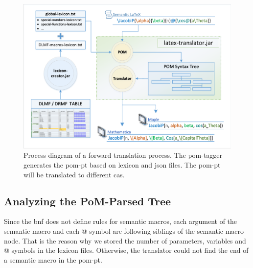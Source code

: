 \documentclass[a4paper,11pt]{article}
\theoremstyle{defTheoStyle}
\theoremstyle{defExampStyle}
\begin{document}
\begin{figure}[ht]
	\vspace{-10pt}
	\centering
	\includegraphics[clip, trim=0.2cm 0.2cm 0.2cm 0.2cm, scale=0.72]{ForwardTranslationProcess.pdf}
	\caption{Process diagram of a forward translation process. The \gls*{pom}-tagger generates the \gls*{pom-pt} based on lexicon and \gls*{json} files. The \gls*{pom-pt} will be translated to different \gls*{cas}.}
	\label{fig:forward-trans}
	\vspace{-10pt}
\end{figure}

\subsection{Analyzing the PoM-Parsed Tree}\label{subsec:analyze-mlp}
Since the \gls*{bnf} does not define rules for semantic macros, each argument of the semantic macro and each $@$ symbol are following siblings of the semantic macro node. That is the reason why we stored the number of parameters, variables and $@$ symbols in the lexicon files. Otherwise, the translator could not find the end of a semantic macro in the \gls*{pom-pt}.
\end{document}
